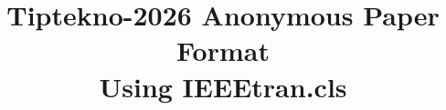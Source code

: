 \documentclass[conference, a4paper]{IEEEtran}
\begin{document}

%
\title{Tiptekno-2026 Anonymous Paper Format\\ Using IEEEtran.cls}



\author{
\IEEEauthorblockA{\\
\\
\\
\\
\\
}
}

% 
\end{document}
